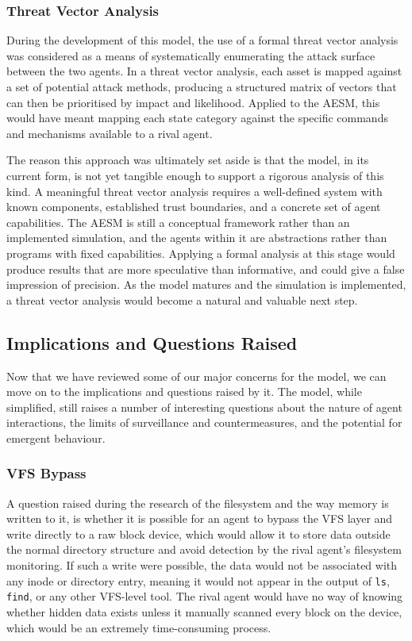 \subsubsection{Threat Vector Analysis}
\label{ThreatVectorAnalysis}

During the development of this model, the use of a formal threat vector analysis was considered as a means of systematically enumerating the attack surface between the two agents. In a threat vector analysis, each asset is mapped against a set of potential attack methods, producing a structured matrix of vectors that can then be prioritised by impact and likelihood. Applied to the AESM, this would have meant mapping each state category against the specific commands and mechanisms available to a rival agent.

The reason this approach was ultimately set aside is that the model, in its current form, is not yet tangible enough to support a rigorous analysis of this kind. A meaningful threat vector analysis requires a well-defined system with known components, established trust boundaries, and a concrete set of agent capabilities. The AESM is still a conceptual framework rather than an implemented simulation, and the agents within it are abstractions rather than programs with fixed capabilities. Applying a formal analysis at this stage would produce results that are more speculative than informative, and could give a false impression of precision. As the model matures and the simulation is implemented, a threat vector analysis would become a natural and valuable next step.

\subsection{Implications and Questions Raised}
\label{ImplicationsAndQuestions}

Now that we have reviewed some of our major concerns for the model, we can move on to the implications and questions raised by it. The model, while simplified, still raises a number of interesting questions about the nature of agent interactions, the limits of surveillance and countermeasures, and the potential for emergent behaviour.

\subsubsection{VFS Bypass}
\label{VFSBypass}

A question raised during the research of the filesystem and the way memory is written to it, is whether it is possible for an agent to bypass the VFS layer and write directly to a raw block device, which would allow it to store data outside the normal directory structure and avoid detection by the rival agent's filesystem monitoring. If such a write were possible, the data would not be associated with any inode or directory entry, meaning it would not appear in the output of \texttt{ls}, \texttt{find}, or any other VFS-level tool. The rival agent would have no way of knowing whether hidden data exists unless it manually scanned every block on the device, which would be an extremely time-consuming process.

